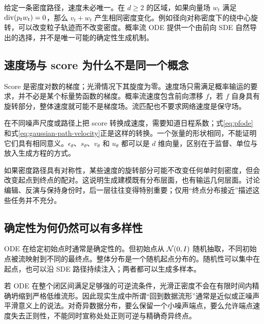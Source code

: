 给定一条密度路径，速度未必唯一。在 $d\ge2$ 的区域，如果向量场 $w_t$ 满足 $\operatorname{div}(p_tw_t)=0$，那么 $v_t+w_t$ 产生相同密度变化。例如径向对称密度下的绕中心旋转，可以改变粒子轨迹而不改变密度。概率流 ODE 提供一个由前向 SDE 自然导出的选择，并不是唯一可能的确定性生成机制。

\subsection{速度场与 score 为什么不是同一个概念}
Score 是密度对数的梯度；光滑情况下其旋度为零。速度场只需满足概率输运的要求，并不必是某个标量势函数的梯度。概率流速度包含前向漂移 $f$，若 $f$ 自身具有旋转部分，整体速度就可能不是梯度场。流匹配也不要求网络速度是保守场。

在不同噪声尺度或路径上把 score 转换成速度，需要知道日程系数；式\eqref{eq:pfode}和式\eqref{eq:gaussian-path-velocity}正是这样的转换。一个张量的形状相同，不能证明它们具有相同意义。$\epsilon_\theta$、$s_\theta$、$v_\theta$ 和 $u_\theta$ 都可以是 $d$ 维向量，区别在于监督、单位与放入生成方程的方式。

如果密度路径具有对称性，某些速度的旋转部分可能不改变任何单时刻密度，但会改变起点到终点的配对。这说明生成建模既有分布层面，也有输运几何层面。讨论编辑、反演与保持身份时，后一层往往变得特别重要；仅用“终点分布接近”描述这些任务并不充分。

\subsection{确定性为何仍然可以有多样性}
ODE 在给定初始点时通常是确定性的。但初始点从 $\mathcal{N}(0,I)$ 随机抽取，不同初始点被流映射到不同的最终点。整体分布是一个随机起点分布的。随机性可以集中在起点，也可以沿 SDE 路径持续注入；两者都可以生成多样本。

若 ODE 在整个闭区间满足足够强的可逆流条件，光滑正密度不会在有限时间内精确坍缩到严格低维流形。因此现实生成中所谓“回到数据流形”通常是近似或正噪声平滑意义上的说法。对奇异数据分布，要么保留一个小噪声端点，要么允许端点速度失去正则性，不能同时宣称处处正则可逆与精确奇异终点。

